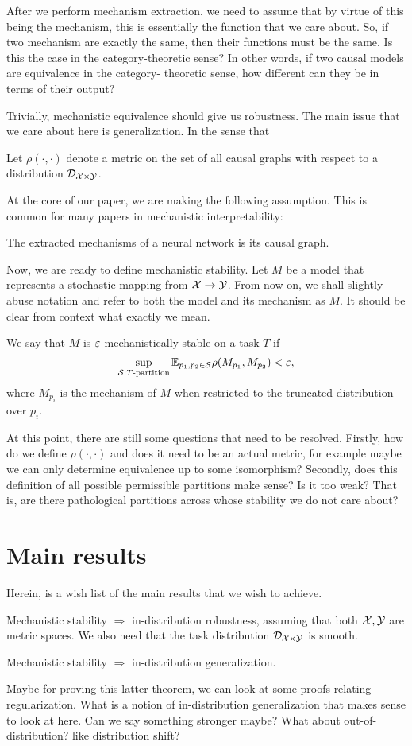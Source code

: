 \documentclass[10pt]{article}
\begin{document}
After we perform mechanism extraction, we need to assume that by virtue
of this being the mechanism, this is essentially the function that we
care about. So, if two mechanism are exactly the same, then their 
functions must be the same. Is this the case in the category-theoretic
sense? In other words, if two causal models are equivalence in the category-
theoretic sense, how different can they be in terms of their output?

Trivially, mechanistic equivalence should give us robustness. 
The main issue that we care about here is generalization. In the sense
that

\begin{defn}
Let $\rho(\cdot,\cdot)$ denote a metric on the set of all causal 
graphs with respect to
a distribution $\mathcal{D}_{\mathcal{X}\times\mathcal{Y}}$.
\end{defn}
At the core of our paper, we are making the following assumption. This is 
common for many papers in mechanistic interpretability:
\begin{asmp}
The extracted mechanisms of a neural network is its causal graph. 
\end{asmp}
Now, we are ready to define mechanistic stability. Let $M$ be a model that
represents a stochastic mapping from $\mathcal{X}\to\mathcal{Y}$. From now on, we shall slightly
abuse notation and refer to both the model and its mechanism as $M$. It should
be clear from context what exactly we mean. 
\begin{defn}
We say that $M$ is $\varepsilon$-mechanistically stable on a task $T$ if 
\[
\sup_{\mathcal{S}: T\text{-partition}}\mathbb{E}_{p_1,p_2 \in \mathcal{S}}
\rho(M_{p_1}, M_{p_2}) < \varepsilon,
\]
where $M_{p_i}$ is the mechanism of $M$ when restricted to
the truncated distribution over $p_i$. 
\end{defn}

At this point, there are still some questions that need to be resolved.
Firstly, how do we define $\rho(\cdot,\cdot)$ and does it need to be an
actual metric, for example maybe we can only determine equivalence
up to some isomorphism? Secondly, does this definition of all possible
permissible partitions make sense? Is it too weak? That is, are there
pathological partitions across whose stability we do not care about?

\section{Main results}
Herein, is a wish list of the main results that we wish to achieve.
\begin{thm}
Mechanistic stability $\Rightarrow$ in-distribution 
robustness, assuming that both $\mathcal{X}, \mathcal{Y}$ are metric spaces. 
We also need that the task distribution $\mathcal{D}_{\mathcal{X}\times \mathcal{Y}}$ is smooth.
\end{thm}
\begin{thm}
Mechanistic stability $\Rightarrow$ in-distribution generalization.
\end{thm}
Maybe for proving this latter theorem, we can look at some proofs relating regularization.
What is a notion of in-distribution generalization that makes sense to look
at here. Can we say something stronger maybe? What about out-of-distribution?
like distribution shift?
\end{document}
